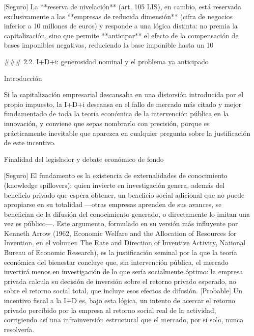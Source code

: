 \documentclass[10pt,a4paper]{article}
\begin{document}
[Seguro] La **reserva de nivelación** (art. 105 LIS), en cambio, está reservada exclusivamente a las **empresas de reducida dimensión** (cifra de negocios inferior a 10 millones de euros) y responde a una lógica distinta: no premia la capitalización, sino que permite **anticipar** el efecto de la compensación de bases imponibles negativas, reduciendo la base imponible hasta un 10%

### 2.2. I+D+i: generosidad nominal y el problema ya anticipado

Introducción

Si la capitalización empresarial descansaba en una distorsión introducida por el propio impuesto, la I+D+i descansa en el fallo de mercado más citado y mejor fundamentado de toda la teoría económica de la intervención pública en la innovación, y conviene que sepas nombrarlo con precisión, porque es prácticamente inevitable que aparezca en cualquier pregunta sobre la justificación de este incentivo.

Finalidad del legislador y debate económico de fondo

[Seguro] El fundamento es la existencia de externalidades de conocimiento (knowledge spillovers): quien invierte en investigación genera, además del beneficio privado que espera obtener, un beneficio social adicional que no puede apropiarse en su totalidad —otras empresas aprenden de sus avances, se benefician de la difusión del conocimiento generado, o directamente lo imitan una vez es público—. Este argumento, formulado en su versión más influyente por Kenneth Arrow (1962, Economic Welfare and the Allocation of Resources for Invention, en el volumen The Rate and Direction of Inventive Activity, National Bureau of Economic Research), es la justificación seminal por la que la teoría económica del bienestar concluye que, sin intervención pública, el mercado invertirá menos en investigación de lo que sería socialmente óptimo: la empresa privada calcula su decisión de inversión sobre el retorno privado esperado, no sobre el retorno social total, que incluye esos efectos de difusión. [Probable] Un incentivo fiscal a la I+D es, bajo esta lógica, un intento de acercar el retorno privado percibido por la empresa al retorno social real de la actividad, corrigiendo así una infrainversión estructural que el mercado, por sí solo, nunca resolvería.
\end{document}
